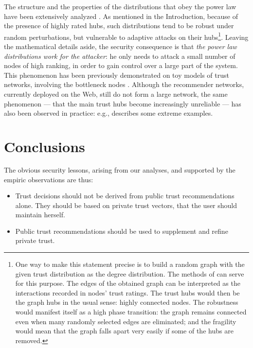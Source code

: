 \documentclass{llncs}
\begin{document}
The structure and the properties of the distributions that obey the power law have been extensively analyzed \cite{mitzenmacher04history,newman05zipf,Newman:networks-book}. As mentioned in the Introduction, because of the presence of highly rated hubs, such distributions tend to be robust under random perturbations, but vulnerable to adaptive attacks on their hubs\footnote{One way to make this statement precise is to build a random graph with the given trust distribution as the degree distribution. The methods of \cite{Aiello} can serve for this purpose. The edges of the obtained graph can be interpreted as the interactions recorded in nodes' trust ratings. The trust hubs would then be the graph hubs in the usual sense: highly connected nodes. The robustness would manifest itself as a high phase transition: the graph remains connected even when many randomly selected edges are eliminated; and the fragility would mean that the graph falls apart very easily if some of the hubs are removed.}. Leaving the mathematical details aside, the security consequence is that {\em the power law distributions work for the attacker\/}: he only needs to attack a small number of nodes of high ranking, in order to gain control over a large part of the system. This phenomenon has been previously demonstrated on toy models of trust networks, involving the bottleneck nodes \cite{LevienR}. Although the recommender networks, currently deployed on the Web, still do not form a large network, the same phenomenon --- that the main trust hubs become increasingly unreliable --- has also been observed in practice: e.g., \cite{EdelmanB:adverse} describes some extreme examples. 

\section{Conclusions}\label{Conclusions}
The obvious security lessons, arising from our analyses, and supported by the empiric observations are thus: 
\begin{itemize}
\item Trust decisions should not be derived from public trust recommendations alone. They should be based on private trust vectors, that the user should maintain herself.
\item Public trust recommendations should be used to supplement and refine private trust.
\end{itemize}
\end{document}
